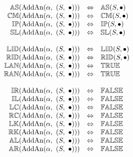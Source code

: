 \[
\begin{array}{rcl} 
{\mathbb{AS}}(\mathrm{AddAn}(\alpha,\ (S,\ \bullet))) 
  & \Leftrightarrow
  & {\mathbb{AS}}(S, \bullet) \\
{\mathbb{CM}}(\mathrm{AddAn}(\alpha,\ (S,\ \bullet))) 
  & \Leftrightarrow
  & {\mathbb{CM}}(S, \bullet) \\
{\mathbb{IP}}(\mathrm{AddAn}(\alpha,\ (S,\ \bullet))) 
  & \Leftrightarrow
  & {\mathbb{IP}}(S, \bullet) \\
{\mathbb{SL}}(\mathrm{AddAn}(\alpha,\ (S,\ \bullet))) 
  & \Leftrightarrow
  & {\mathbb{SL}}(S, \bullet) \\\\
  
{\mathbb{LID}}(\mathrm{AddAn}(\alpha,\ (S,\ \bullet))) 
  & \Leftrightarrow
  & {\mathbb{LID}}(S, \bullet) \\
{\mathbb{RID}}(\mathrm{AddAn}(\alpha,\ (S,\ \bullet))) 
  & \Leftrightarrow
  & {\mathbb{RID}}(S, \bullet) \\
{\mathbb{LAN}}(\mathrm{AddAn}(\alpha,\ (S,\ \bullet))) 
  & \Leftrightarrow
  & {\mathbb{TRUE}} \\ 
{\mathbb{RAN}}(\mathrm{AddAn}(\alpha,\ (S,\ \bullet))) 
  & \Leftrightarrow
  & {\mathbb{TRUE}} \\\\
  
{\mathbb{IR}}(\mathrm{AddAn}(\alpha,\ (S,\ \bullet))) 
  & \Leftrightarrow
  & {\mathbb{FALSE}}\\ 
{\mathbb{IL}}(\mathrm{AddAn}(\alpha,\ (S,\ \bullet))) 
  & \Leftrightarrow
  & {\mathbb{FALSE}}\\ 
{\mathbb{LC}}(\mathrm{AddAn}(\alpha,\ (S,\ \bullet))) 
  & \Leftrightarrow
  & {\mathbb{FALSE}}\\ 
{\mathbb{RC}}(\mathrm{AddAn}(\alpha,\ (S,\ \bullet))) 
  & \Leftrightarrow
  & {\mathbb{FALSE}}\\ 
{\mathbb{LK}}(\mathrm{AddAn}(\alpha,\ (S,\ \bullet))) 
  & \Leftrightarrow 
  & {\mathbb{FALSE}}\\ 
{\mathbb{RK}}(\mathrm{AddAn}(\alpha,\ (S,\ \bullet))) 
  & \Leftrightarrow
  & {\mathbb{FALSE}}\\ 
{\mathbb{AL}}(\mathrm{AddAn}(\alpha,\ (S,\ \bullet))) 
  & \Leftrightarrow
  & {\mathbb{FALSE}}\\ 
{\mathbb{AR}}(\mathrm{AddAn}(\alpha,\ (S,\ \bullet))) 
  & \Leftrightarrow
  & {\mathbb{FALSE}}\\ 
\end{array} 
\] 
